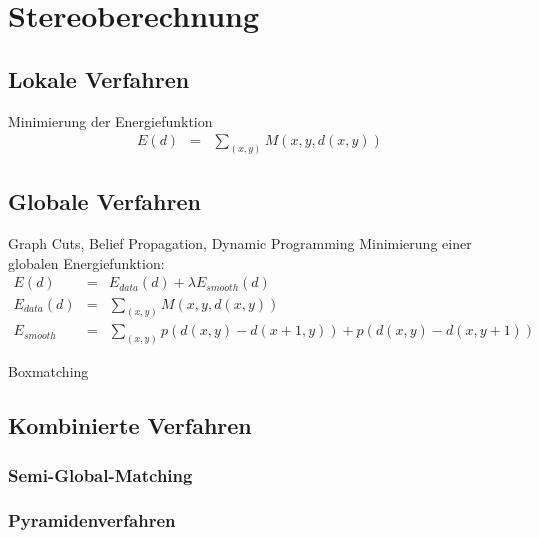 \chapter{Stereoberechnung}
\section{Lokale Verfahren}
Minimierung der Energiefunktion
\begin{eqnarray}
 E(d) &=& \sum_{(x, y)} M(x, y, d(x, y))
\end{eqnarray}

\section{Globale Verfahren}
Graph Cuts, Belief Propagation, Dynamic Programming
Minimierung einer globalen Energiefunktion:
\begin{eqnarray}
 E(d) &=& E_{data}(d)+ \lambda E_{smooth}(d) \\
 E_{data}(d) &=& \sum_{(x, y)} M(x, y, d(x, y)) \\
 E_{smooth} &=& \sum_{(x, y)} p(d(x, y)-d(x+1, y))+p(d(x, y)-d(x, y+1))
\end{eqnarray}\cite{stereo_globallocal}

Boxmatching
\section{Kombinierte Verfahren}
\subsection{Semi-Global-Matching}
\subsection{Pyramidenverfahren}
